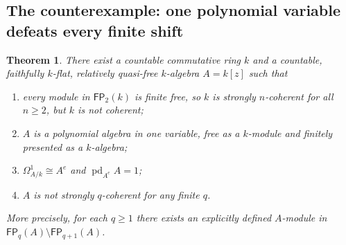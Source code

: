 \documentclass[11pt]{article}
\numberwithin{equation}{section}
\newtheorem{theorem}{Theorem}[section]
\theoremstyle{definition}
\theoremstyle{remark}
\newcommand{\FP}{\mathsf{FP}}
\begin{document}
\subsection{The counterexample: one polynomial variable defeats every finite shift}

\begin{theorem}\label{neg:thm:main}
There exist a countable commutative ring $k$ and a countable,
faithfully $k$-flat, relatively quasi-free $k$-algebra $A=k[z]$ such that
\begin{enumerate}[label=(\roman*)]
\item every module in $\FP_2(k)$ is finite free, so $k$ is strongly
$n$-coherent for all $n\ge2$, but $k$ is not coherent;
\item $A$ is a polynomial algebra in one variable, free as a $k$-module
and finitely presented as a $k$-algebra;
\item $\Omega^1_{A/k}\cong A^e$ and $\operatorname{pd}_{A^e}A=1$;
\item $A$ is not strongly $q$-coherent for \emph{any} finite $q$.
\end{enumerate}
More precisely, for each $q\ge1$ there exists an explicitly defined
$A$-module in $\FP_q(A)\setminus\FP_{q+1}(A)$.
\end{theorem}
\end{document}
